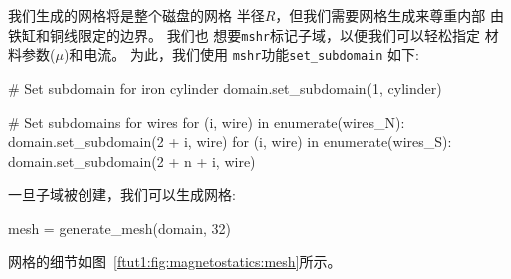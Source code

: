我们生成的网格将是整个磁盘的网格
半径$R$，但我们需要网格生成来尊重内部
由铁缸和铜线限定的边界。 我们也
想要\texttt{mshr}标记子域，以便我们可以轻松指定
材料参数($\mu$)和电流。 为此，我们使用
\texttt{mshr}功能\verb!set_subdomain! 如下:

\begin{python}
# Set subdomain for iron cylinder
domain.set_subdomain(1, cylinder)

# Set subdomains for wires
for (i, wire) in enumerate(wires_N):
    domain.set_subdomain(2 + i, wire)
for (i, wire) in enumerate(wires_S):
    domain.set_subdomain(2 + n + i, wire)
\end{python}
一旦子域被创建，我们可以生成网格:

\begin{python}
mesh = generate_mesh(domain, 32)
\end{python}
网格的细节如图~\ref{ftut1:fig:magnetostatics:mesh}所示。

